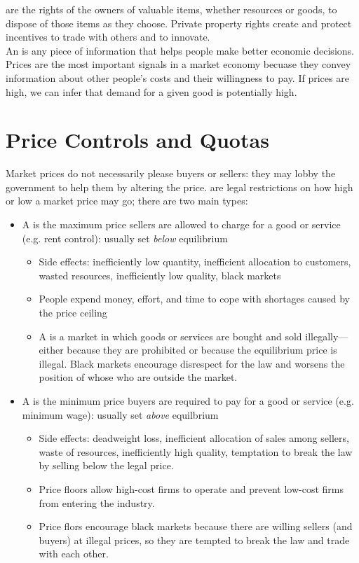 \documentclass{article}
\begin{document}
 are the rights of the owners of valuable items, whether resources or goods, to dispose of those items as they choose. Private property rights create and protect incentives to trade with others and to innovate. \\ 

An  is any piece of information that helps people make better economic decisions. Prices are the most important signals in a market economy becuase they convey information about other people's costs and their willingness to pay. If prices are high, we can infer that demand for a given good is potentially high. 

\section{Price Controls and Quotas}

Market prices do not necessarily please buyers or sellers: they may lobby the government to help them by altering the price.  are legal restrictions on how high or low a market price may go; there are two main types: 
\begin{itemize}
  \item A  is the maximum price sellers are allowed to charge for a good or service (e.g. rent control): usually set \emph{below} equilibrium 
    \begin{itemize}
      \item Side effects: inefficiently low quantity, inefficient allocation to customers, wasted resources, inefficiently low quality, black markets
      \item People expend money, effort, and time to cope with shortages caused by the price ceiling 
      \item A  is a market in which goods or services are bought and sold illegally---either because they are prohibited or because the equilibrium price is illegal. Black markets encourage disrespect for the law and worsens the position of whose who are outside the market. 
    \end{itemize}
  \item A  is the minimum price buyers are required to pay for a good or service (e.g. minimum wage): usually set \emph{above} equilbrium
    \begin{itemize}
      \item Side effects: deadweight loss, inefficient allocation of sales among sellers, waste of resources, inefficiently high quality, temptation to break the law by selling below the legal price. 
      \item Price floors allow high-cost firms to operate and prevent low-cost firms from entering the industry. 
      \item Price flors encourage black markets because there are willing sellers (and buyers) at illegal prices, so they are tempted to break the law and trade with each other. 
    \end{itemize}
\end{itemize}
\end{document}
